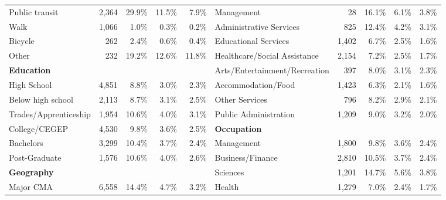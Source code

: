 \documentclass[10 pt,letterpaper]{article}
\begin{document}
\begin{table}[H]
{\begin{tabular}{lrrrrlrrrr}
			Public transit                 & 2,364  & 29.9\%      & 11.5\%     & 7.9\%      & Management                        & 28    & 16.1\%      & 6.1\%       & 3.8\%     \\
			Walk                           & 1,066  & 1.0\%       & 0.3\%      & 0.2\%      & Administrative Services           & 825   & 12.4\%      & 4.2\%       & 3.1\%     \\
			Bicycle                        & 262    & 2.4\%       & 0.6\%      & 0.4\%      & Educational Services              & 1,402 & 6.7\%       & 2.5\%       & 1.6\%     \\
			Other                          & 232    & 19.2\%      & 12.6\%     & 11.8\%     & Healthcare/Social Assistance & 2,154 & 7.2\%       & 2.5\%       & 1.7\%     \\
			\textbf{Education}             &        &             &            &            & Arts/Entertainment/Recreation     & 397   & 8.0\%       & 3.1\%       & 2.3\%     \\
			High School                    & 4,851  & 8.8\%       & 3.0\%      & 2.3\%      & Accommodation/Food                & 1,423 & 6.3\%       & 2.1\%       & 1.6\%     \\
			Below high school              & 2,113  & 8.7\%       & 3.1\%      & 2.5\%      & Other Services                    & 796   & 8.2\%       & 2.9\%       & 2.1\%     \\
			Trades/Apprenticeship        & 1,954  & 10.6\%      & 4.0\%      & 3.1\%      & Public Administration             & 1,209 & 9.0\%       & 3.2\%       & 2.0\%     \\
			College/CEGEP                & 4,530  & 9.8\%       & 3.6\%      & 2.5\%      & \textbf{Occupation}               &       &             &             &           \\
			Bachelors                      & 3,299  & 10.4\%      & 3.7\%      & 2.4\%      & Management                        & 1,800 & 9.8\%       & 3.6\%       & 2.4\%     \\
			Post-Graduate                  & 1,576  & 10.6\%      & 4.0\%      & 2.6\%      & Business/Finance                  & 2,810 & 10.5\%      & 3.7\%       & 2.4\%     \\
			\textbf{Geography}             &        &             &            &            & Sciences                          & 1,201 & 14.7\%      & 5.6\%       & 3.8\%     \\
			Major CMA                      & 6,558  & 14.4\%      & 4.7\%      & 3.2\%      & Health                            & 1,279 & 7.0\%       & 2.4\%       & 1.7\%     \\

\end{tabular}}
\end{table}
\end{document}
